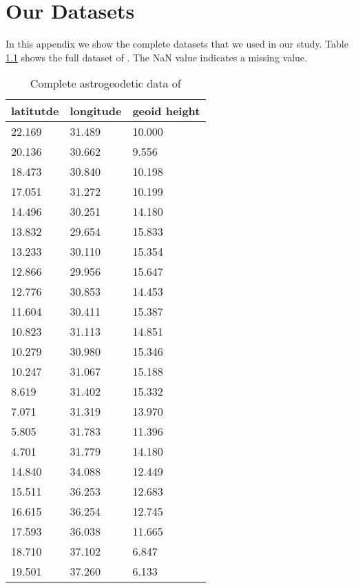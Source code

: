 \chapter{Our Datasets}
In this appendix we show the complete datasets that we used in our study. Table \ref{complete_astrodata} shows the full dataset of \cite{osman}. The NaN value indicates a missing value.
\begin{table}[]
	\centering
	\caption{Complete astrogeodetic data of \cite{osman}}
	\label{complete_astrodata}
	\begin{tabular}{@{}lll@{}}
		\toprule
		latitutde & longitude & geoid height \\ \midrule
		22.169    & 31.489    & 10.000       \\
		20.136    & 30.662    & 9.556        \\
		18.473    & 30.840    & 10.198       \\
		17.051    & 31.272    & 10.199       \\
		14.496    & 30.251    & 14.180       \\
		13.832    & 29.654    & 15.833       \\
		13.233    & 30.110    & 15.354       \\
		12.866    & 29.956    & 15.647       \\
		12.776    & 30.853    & 14.453       \\
		11.604    & 30.411    & 15.387       \\
		10.823    & 31.113    & 14.851       \\
		10.279    & 30.980    & 15.346       \\
		10.247    & 31.067    & 15.188       \\
		8.619     & 31.402    & 15.332       \\
		7.071     & 31.319    & 13.970       \\
		5.805     & 31.783    & 11.396       \\
		4.701     & 31.779    & 14.180       \\
		14.840    & 34.088    & 12.449       \\
		15.511    & 36.253    & 12.683       \\
		16.615    & 36.254    & 12.745       \\
		17.593    & 36.038    & 11.665       \\
		18.710    & 37.102    & 6.847        \\
		19.501    & 37.260    & 6.133        \\

\end{tabular}
\end{table}
